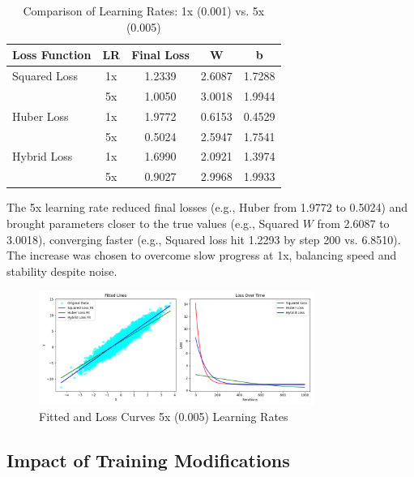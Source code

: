 \documentclass{article}
\begin{document}
\begin{table}[h]
    \centering
    \caption{Comparison of Learning Rates: 1x (0.001) vs. 5x (0.005)}
    \label{tab:lr_comparison}
    \begin{tabular}{lcccc}
        \toprule
        \textbf{Loss Function} & \textbf{LR} & \textbf{Final Loss} & \textbf{W} & \textbf{b} \\
        \midrule
        Squared Loss & 1x  & 1.2339 & 2.6087 & 1.7288 \\
                     & 5x  & 1.0050 & 3.0018 & 1.9944 \\
        Huber Loss   & 1x  & 1.9772 & 0.6153 & 0.4529 \\
                     & 5x  & 0.5024 & 2.5947 & 1.7541 \\
        Hybrid Loss  & 1x  & 1.6990 & 2.0921 & 1.3974 \\
                     & 5x  & 0.9027 & 2.9968 & 1.9933 \\
        \bottomrule
    \end{tabular}
\end{table}

The 5x learning rate reduced final losses (e.g., Huber from 1.9772 to 0.5024) and brought parameters closer to the true values (e.g., Squared \( W \) from 2.6087 to 3.0018), converging faster (e.g., Squared loss hit 1.2293 by step 200 vs. 6.8510). The increase was chosen to overcome slow progress at 1x, balancing speed and stability despite noise.

\begin{figure}[h]
    \centering
    \includegraphics[width=0.8\textwidth]{assets/bigger_learning_rate.png}
    \caption{Fitted and Loss Curves 5x (0.005) Learning Rates}
    \label{fig:bigger_learning_rate}
\end{figure}

\subsection{Impact of Training Modifications}
\end{document}
